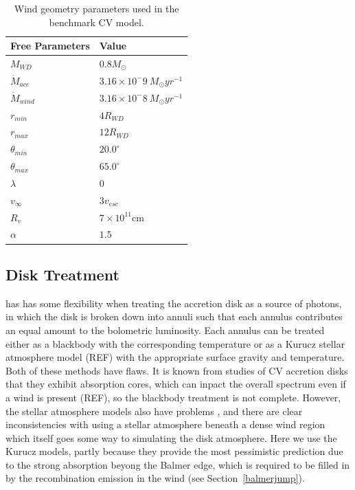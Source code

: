 \documentclass[useAMS,usenatbib, onecolumn]{mn2ejm}
\begin{document}
\begin{table}
\centering
\begin{tabular}{p{3cm}p{4cm}}
\hline Free Parameters 	&	 Value \\ 
\hline \hline 
$M_{WD}$ 	 &	 $0.8 M_{\odot}$ \\ 
$\dot{M}_{acc}$ 	 &	 $3.16\times 10^-9~M_{\odot}yr^{-1}$\\ 
$\dot{M}_{wind}$  &	$3.16\times 10^-8~M_{\odot}yr^{-1}$\\ 
$r_{min}$ 	&	 $4 R_{WD}$\\ 
$r_{max}$ 	&	 $12 R_{WD}$ \\ 
$\theta_{min}$ 	&	 $20.0^{\circ}$ \\ 
$\theta_{max}$ 	&	 $65.0^{\circ}$ \\ 
$\lambda$ 	&	 $0$ \\ 
$v_{\infty}$ 	&	 $3v_{esc}$ \\ 
$R_v$ 	        &	 $7\times10^{11}$cm \\ 
$\alpha$ 	&	 $1.5$ \\
\end{tabular}
\centering
\caption{Wind geometry parameters used in the benchmark CV model.}
\label{wind_param}
\end{table}

\subsection{Disk Treatment}

\py has has some flexibility when treating the accretion disk as a source of photons, in which the disk is broken down into annuli 
such that each annulus contributes an equal amount to the bolometric luminosity. Each annulus can 
be treated either as a blackbody with the corresponding temperature or as a Kurucz stellar atmosphere model (REF)
with the appropriate surface gravity and temperature. Both of these methods have flaws. It is known
from studies of CV accretion disks that they exhibit absorption cores, which can inpact the overall spectrum 
even if a wind is present (REF), so the blackbody treatment is not complete. However, the stellar atmosphere
models also have problems \cite{wadedisk}, and there are clear inconsistencies with using a stellar atmosphere beneath a dense
wind region which itself goes some way to simulating the disk atmosphere. Here we use the Kurucz models,
partly because they provide the most pessimistic prediction due to the strong absorption beyong the Balmer edge, 
which is required to be filled in by the recombination emission in the wind (see Section~\ref{balmerjump}).
\end{document}
